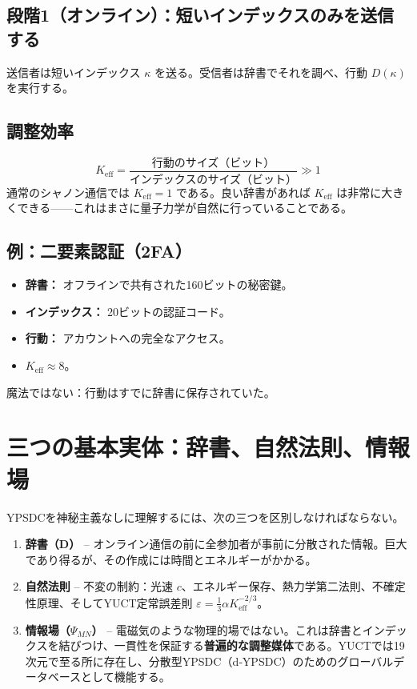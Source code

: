 \documentclass[12pt,a4paper]{article}
\begin{document}
	\subsection{段階1（オンライン）：短いインデックスのみを送信する}
	送信者は短いインデックス \(\kappa\) を送る。受信者は辞書でそれを調べ、行動 \(D(\kappa)\) を実行する。
	
	\subsection{調整効率}
	\[
	K_{\mathrm{eff}} = \frac{\text{行動のサイズ（ビット）}}{\text{インデックスのサイズ（ビット）}} \gg 1
	\]
	通常のシャノン通信では \(K_{\mathrm{eff}}=1\) である。良い辞書があれば \(K_{\mathrm{eff}}\) は非常に大きくできる——これはまさに量子力学が自然に行っていることである。
	
	\subsection{例：二要素認証（2FA）}
	\begin{itemize}
		\item \textbf{辞書：} オフラインで共有された160ビットの秘密鍵。
		\item \textbf{インデックス：} 20ビットの認証コード。
		\item \textbf{行動：} アカウントへの完全なアクセス。
		\item \(K_{\mathrm{eff}} \approx 8\)。
	\end{itemize}
	魔法ではない：行動はすでに辞書に保存されていた。
	
	\section{三つの基本実体：辞書、自然法則、情報場}
	
	YPSDCを神秘主義なしに理解するには、次の三つを区別しなければならない。
	
	\begin{enumerate}
		\item \textbf{辞書（D）} -- オンライン通信の前に全参加者が事前に分散された情報。巨大であり得るが、その作成には時間とエネルギーがかかる。
		\item \textbf{自然法則} -- 不変の制約：光速 \(c\)、エネルギー保存、熱力学第二法則、不確定性原理、そしてYUCT定常誤差則 \(\varepsilon = \frac13 \alpha K_{\mathrm{eff}}^{-2/3}\)。
		\item \textbf{情報場（\(\Psi_{MN}\)）} -- 電磁気のような物理的場ではない。これは辞書とインデックスを結びつけ、一貫性を保証する\textbf{普遍的な調整媒体}である。YUCTでは19次元で至る所に存在し、分散型YPSDC（d‑YPSDC）のためのグローバルデータベースとして機能する。
	\end{enumerate}
	
\end{document}

